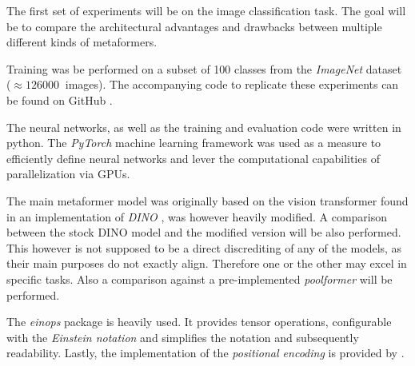 The first set of experiments will be on the image classification task.
The goal will be to compare the architectural advantages and drawbacks between multiple different kinds of metaformers.

Training was be performed on a subset of 100 classes from the \emph{ImageNet} dataset \cite{imagenetDataset} ($\approx \SI{126000}{}$ images).
The accompanying code to replicate these experiments can be found on GitHub \cite{selfComputerScience}.

The neural networks, as well as the training and evaluation code were written in python.
The \emph{PyTorch} \cite{pytorchGithub} machine learning framework was used as a measure to efficiently define neural networks and lever the computational capabilities of parallelization via GPUs.

The main metaformer model was originally based on the vision transformer found in an implementation of \emph{DINO} \cite{dinoGithub}, was however heavily modified. 
A comparison between the stock DINO model and the modified version will be also performed.
This however is not supposed to be a direct discrediting of any of the models, as their main purposes do not exactly align.
Therefore one or the other may excel in specific tasks.
Also a comparison against a pre-implemented \emph{poolformer} \cite{poolformerGithub} will be performed.

The \emph{einops} package \cite{einopsGithub} is heavily used. It provides tensor operations, configurable with the \emph{Einstein notation} and simplifies the notation and subsequently readability.
Lastly, the implementation of the \emph{positional encoding} is provided by \cite{positionalEncodingGithub}.
